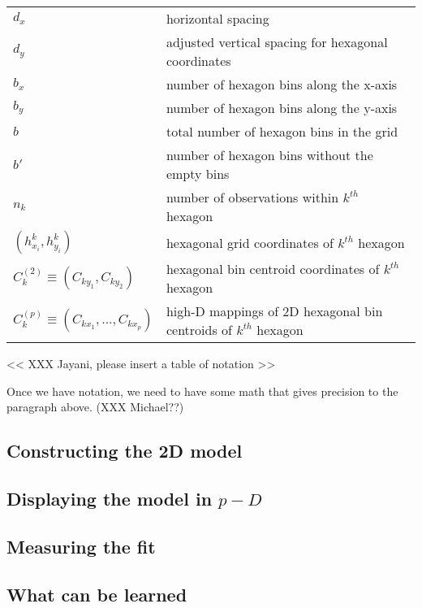 \documentclass[
  12pt]{article}
\begin{document}
\begin{table}
\begin{tabular}[t]{ll}
\addlinespace
$d_x$ & horizontal spacing\\
$d_y$ & adjusted vertical spacing for hexagonal coordinates\\
$b_x$ & number of hexagon bins along the x-axis\\
$b_y$ & number of hexagon bins along the y-axis\\
$b$ & total number of hexagon bins in the grid\\
\addlinespace
$b'$ & number of hexagon bins without the empty bins\\
$n_k$ & number of observations within $k^{th}$ hexagon\\
$(h^k_{x_i}, h^k_{y_i})$ & hexagonal grid coordinates of $k^{th}$ hexagon\\
$C_k^{(2)} \equiv (C_{ky_1}, C_{ky_2})$ & hexagonal bin centroid coordinates of $k^{th}$ hexagon\\
$C_k^{(p)} \equiv (C_{kx_1}, ..., C_{kx_p})$ & high-D mappings of 2D hexagonal bin centroids of $k^{th}$ hexagon\\
\bottomrule
\end{tabular}
\end{table}

\textless\textless{} XXX Jayani, please insert a table of notation
\textgreater\textgreater{}

Once we have notation, we need to have some math that gives precision to
the paragraph above. (XXX Michael??)

\subsection{Constructing the 2D model}\label{constructing-the-2d-model}

\subsection{\texorpdfstring{Displaying the model in
\(p-D\)}{Displaying the model in p-D}}\label{displaying-the-model-in-p-d}

\subsection{Measuring the fit}\label{measuring-the-fit}

\subsection{What can be learned}\label{what-can-be-learned}
\end{document}

